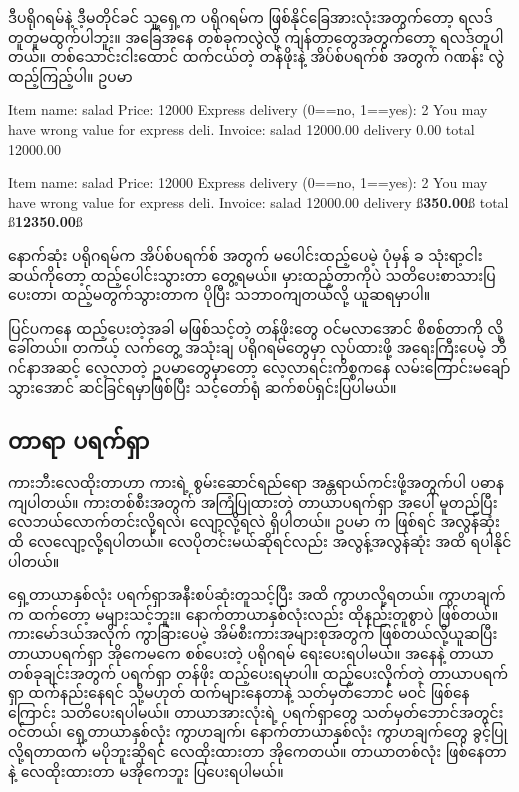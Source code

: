 ဒီပရိုဂရမ်နဲ့ ဒီ့မတိုင်ခင် သူ့ရှေ့က ပရိုဂရမ်က ဖြစ်နိုင်ခြေအားလုံးအတွက်တော့ ရလဒ် တူတူမထွက်ပါဘူး။  အခြေအနေ တစ်ခုကလွဲလို့ ကျန်တာတွေအတွက်တော့ ရလဒ်တူပါတယ်။ တစ်သောင်းငါးထောင် ထက်ငယ်တဲ့ တန်ဖိုးနဲ့ အိပ်စ်ပရက်စ်  အတွက် ဂဏန်း လွဲထည့်ကြည့်ပါ။ ဥပမာ

\begin{codetxt}
Item name: salad
Price: 12000
Express delivery (0==no, 1==yes): 2
You may have wrong value for express deli.
Invoice: 
salad      12000.00
delivery       0.00
total      12000.00
\end{codetxt}
\betweenminted{\medskipamount}
\begin{codetxt}
Item name: salad
Price: 12000
Express delivery (0==no, 1==yes): 2
You may have wrong value for express deli.
Invoice: 
salad      12000.00
delivery     ß\textbf{350.00}ß
total      ß\textbf{12350.00}ß
\end{codetxt}
နောက်ဆုံး ပရိုဂရမ်က အိပ်စ်ပရက်စ်  အတွက် မပေါင်းထည့်ပေမဲ့ ပုံမှန်  ခ သုံးရာ့ငါးဆယ်ကိုတော့ ထည့်ပေါင်းသွားတာ တွေ့ရမယ်။ မှားထည့်တာကိုပဲ သတိပေးစာသားပြပေးတာ၊ ထည့်မတွက်သွားတာက ပိုပြီး သဘာဝကျတယ်လို့ ယူဆရမှာပါ။

\begin{mytcbox}
ပြင်ပကနေ ထည့်ပေးတဲ့အခါ မဖြစ်သင့်တဲ့  တန်ဖိုးတွေ ဝင်မလာအောင် စိစစ်တာကို  လို့ ခေါ်တယ်။ တကယ့် လက်တွေ့ အသုံးချ ပရိုဂရမ်တွေမှာ  လုပ်ထားဖို့ အရေးကြီးပေမဲ့ ဘီဂင်နာအဆင့် လေ့လာတဲ့ ဥပမာတွေမှာတော့ လေ့လာရင်းကိစ္စကနေ လမ်းကြောင်းမချော်သွားအောင် ဆင်ခြင်ရမှာဖြစ်ပြီး သင့်တော်ရုံ ဆက်စပ်ရှင်းပြပါမယ်။ 
\end{mytcbox}

\subsection*{တာရာ ပရက်ရှာ}

ကားဘီးလေထိုးတာဟာ ကားရဲ့ စွမ်းဆောင်ရည်ရော အန္တရာယ်ကင်းဖို့အတွက်ပါ ပဓာနကျပါတယ်။ ကားတစ်စီးအတွက် အကြံပြုထားတဲ့ တာယာပရက်ရှာ  အပေါ် မူတည်ပြီး လေဘယ်လောက်တင်းလို့ရလဲ၊ လျော့လို့ရလဲ ရှိပါတယ်။ ဥပမာ  က  ဖြစ်ရင် အလွန်ဆုံး  ထိ လေလျော့လို့ရပါတယ်။ လေပိုတင်းမယ်ဆိုရင်လည်း အလွန့်အလွန်ဆုံး  အထိ ရပါနိုင်ပါတယ်။

ရှေ့တာယာနှစ်လုံး ပရက်ရှာအနီးစပ်ဆုံးတူသင့်ပြီး  အထိ ကွာဟလို့ရတယ်။ ကွာဟချက်က  ထက်တော့ မများသင့်ဘူး။ နောက်တာယာနှစ်လုံးလည်း ထိုနည်းတူစွာပဲ ဖြစ်တယ်။ ကားမော်ဒယ်အလိုက်  ကွာခြားပေမဲ့ အိမ်စီးကားအများစုအတွက်  ဖြစ်တယ်လို့ယူဆပြီး တာယာပရက်ရှာ အိုကေမကေ စစ်ပေးတဲ့ ပရိုဂရမ် ရေးပေးရပါမယ်။  အနေနဲ့ တာယာတစ်ခုချင်းအတွက် ပရက်ရှာ  တန်ဖိုး ထည့်ပေးရမှာပါ။ ထည့်ပေးလိုက်တဲ့ တာယာပရက်ရှာ  ထက်နည်းနေရင် သို့မဟုတ်  ထက်များနေတာနဲ့ သတ်မှတ်ဘောင် မဝင်  ဖြစ်နေကြောင်း သတိပေးရပါမယ်။ တာယာအားလုံးရဲ့ ပရက်ရှာတွေ သတ်မှတ်ဘောင်အတွင်း ဝင်တယ်၊ ရှေ့တာယာနှစ်လုံး ကွာဟချက်၊ နောက်တာယာနှစ်လုံး ကွာဟချက်တွေ ခွင့်ပြုလို့ရတာထက် မပိုဘူးဆိုရင် လေထိုးထားတာ အိုကေတယ်။ တာယာတစ်လုံး  ဖြစ်နေတာနဲ့ လေထိုးထားတာ မအိုကေဘူး ပြပေးရပါမယ်။

